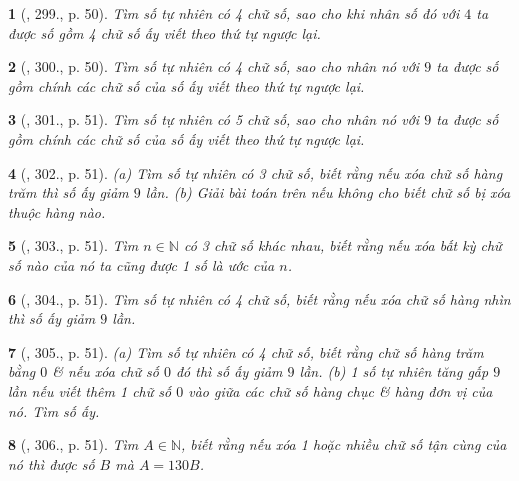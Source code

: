\documentclass{article}
\newtheorem{baitoan}{}
\begin{document}
\begin{baitoan}[\cite{Binh_Toan_6_tap_1}, 299., p. 50]
	Tìm số tự nhiên có 4 chữ số, sao cho khi nhân số đó với $4$ ta được số gồm 4 chữ số ấy viết theo thứ tự ngược lại.
\end{baitoan}

\begin{baitoan}[\cite{Binh_Toan_6_tap_1}, 300., p. 50]
	Tìm số tự nhiên có 4 chữ số, sao cho nhân nó với $9$ ta được số gồm chính các chữ số của số ấy viết theo thứ tự ngược lại.
\end{baitoan}

\begin{baitoan}[\cite{Binh_Toan_6_tap_1}, 301., p. 51]
	Tìm số tự nhiên có 5 chữ số, sao cho nhân nó với $9$ ta được số gồm chính các chữ số của số ấy viết theo thứ tự ngược lại.
\end{baitoan}

\begin{baitoan}[\cite{Binh_Toan_6_tap_1}, 302., p. 51]
	(a) Tìm số tự nhiên có 3 chữ số, biết rằng nếu xóa chữ số hàng trăm thì số ấy giảm $9$ lần. (b) Giải bài toán trên nếu không cho biết chữ số bị xóa thuộc hàng nào.
\end{baitoan}

\begin{baitoan}[\cite{Binh_Toan_6_tap_1}, 303., p. 51]
	Tìm $n\in\mathbb{N}$ có 3 chữ số khác nhau, biết rằng nếu xóa bất kỳ chữ số nào của nó ta cũng được 1 số là ước của $n$.	
\end{baitoan}

\begin{baitoan}[\cite{Binh_Toan_6_tap_1}, 304., p. 51]
	Tìm số tự nhiên có 4 chữ số, biết rằng nếu xóa chữ số hàng nhìn thì số ấy giảm $9$ lần.
\end{baitoan}

\begin{baitoan}[\cite{Binh_Toan_6_tap_1}, 305., p. 51]
	(a) Tìm số tự nhiên có 4 chữ số, biết rằng chữ số hàng trăm bằng $0$ \& nếu xóa chữ số $0$ đó thì số ấy giảm $9$ lần. (b) 1 số tự nhiên tăng gấp $9$ lần nếu viết thêm 1 chữ số $0$ vào giữa các chữ số hàng chục \& hàng đơn vị của nó. Tìm số ấy.
\end{baitoan}

\begin{baitoan}[\cite{Binh_Toan_6_tap_1}, 306., p. 51]
	Tìm $A\in\mathbb{N}$, biết rằng nếu xóa 1 hoặc nhiều chữ số tận cùng của nó thì được số $B$ mà $A = 130B$.
\end{baitoan}
\end{document}

